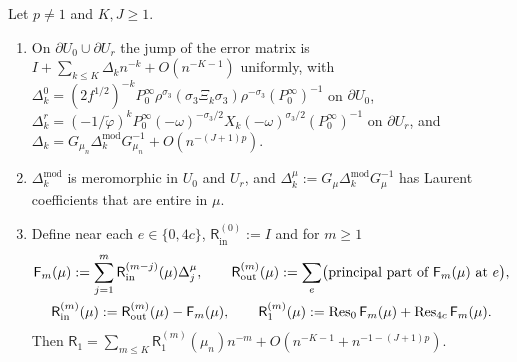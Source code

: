 \begin{proposition}\label{prop:N6c}
Let $p\ne1$ and $K,J\ge1$.
\begin{enumerate}
\item[(a)] On $\partial U_0\cup\partial U_r$ the jump of the error matrix is $I+\sum_{k\le K}\Delta_kn^{-k}+O(n^{-K-1})$ uniformly, with
$\Delta_k^0=(2f^{1/2})^{-k}P_0^\infty\rho^{\sigma_3}(\sigma_3\Xi_k\sigma_3)\rho^{-\sigma_3}(P_0^\infty)^{-1}$ on $\partial U_0$,
$\Delta_k^r=(-1/\tilde\varphi)^kP_0^\infty(-\omega)^{-\sigma_3/2}X_k(-\omega)^{\sigma_3/2}(P_0^\infty)^{-1}$ on $\partial U_r$, and
$\Delta_k=G_{\mu_n}\Delta_k^{\mathrm{mod}}G_{\mu_n}^{-1}+O(n^{-(J+1)p})$.
\item[(b)] $\Delta_k^{\mathrm{mod}}$ is meromorphic in $U_0$ and $U_r$, and $\Delta_k^\mu:=G_\mu\Delta_k^{\mathrm{mod}}G_\mu^{-1}$ has Laurent
coefficients that are entire in $\mu$.
\item[(c)] Define near each $e\in\{0,4c\}$, $\mathsf R_{\mathrm{in}}^{(0)}:=I$ and for $m\ge1$
\begin{equation}\label{eq:recursion}
\begin{gathered}
  \mathsf F_m(\mu):=\sum_{j=1}^m\mathsf R_{\mathrm{in}}^{(m-j)}(\mu)\Delta_j^\mu,\qquad
  \mathsf R_{\mathrm{out}}^{(m)}(\mu):=\sum_{e}\bigl(\text{principal part of }\mathsf F_m(\mu)\text{ at }e\bigr),\\
  \mathsf R_{\mathrm{in}}^{(m)}(\mu):=\mathsf R_{\mathrm{out}}^{(m)}(\mu)-\mathsf F_m(\mu),\qquad
  \mathsf R_1^{(m)}(\mu):=\operatorname{Res}_0\mathsf F_m(\mu)+\operatorname{Res}_{4c}\mathsf F_m(\mu).
\end{gathered}
\end{equation}
Then $\mathsf R_1=\sum_{m\le K}\mathsf R_1^{(m)}(\mu_n)n^{-m}+O(n^{-K-1}+n^{-1-(J+1)p})$.
\end{enumerate}
\end{proposition}

